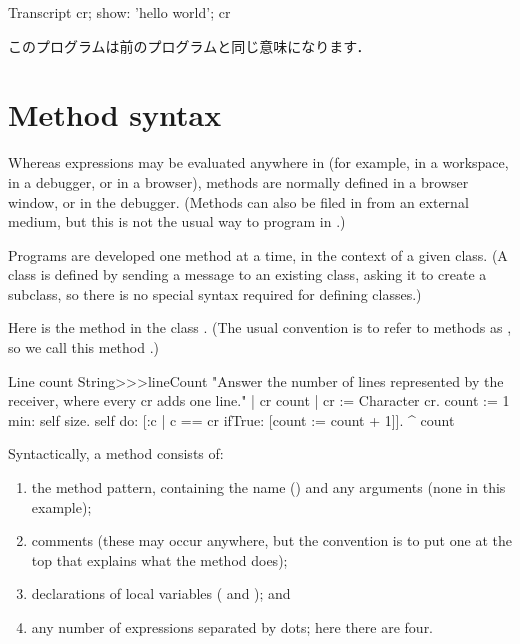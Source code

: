 \documentclass[a4paper,10pt,twoside]{book}
\begin{document}
\begin{code}{}
Transcript cr;
    show: 'hello world';
    cr
\end{code}
このプログラムは前のプログラムと同じ意味になります．

\section{Method syntax}

Whereas expressions may be evaluated anywhere in \pharo (for example, in a workspace, in a debugger, or in a browser), methods are normally defined in a browser window, or in the debugger.
(Methods can also be filed in from an external medium, but this is not the usual way to program in \pharo.)

Programs are developed one method at a time, in the context of a given class.
(A class is defined by sending a message to an existing class, asking it to create a subclass, so there is no special syntax required for defining classes.)

Here is the method  in the class .
(The usual convention is to refer to methods as , so we call this method .)

\begin{method}[lineCount]{Line count}
String>>>lineCount
   "Answer the number of lines represented by the receiver,
   where every cr adds one line."
   | cr count |
   cr := Character cr.
   count := 1 min: self size.
   self do:
      [:c | c == cr ifTrue: [count := count + 1]].
   ^ count
\end{method}

Syntactically, a method consists of:
\begin{enumerate}
  \item the method pattern, containing the name (\ie {}) and any arguments (none in this example);
  \item comments (these may occur anywhere, but the convention is to put one at the top that explains what the method does);
  \item declarations of local variables (\ie {} and ); and
  \item any number of expressions separated by dots; here there are four.
\end{enumerate}
\end{document}
